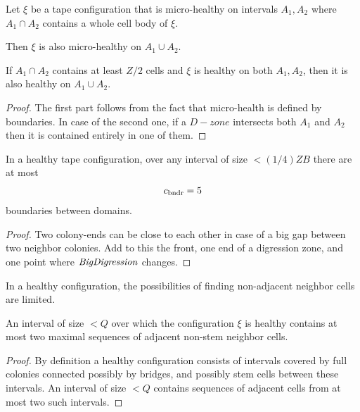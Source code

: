 \documentclass[11pt]{memoir}
\theoremstyle{definition} %
\newtheorem{Premark}{\color{cyan}Peter remark}
\newenvironment{premark}{\begin{Premark}\color{cyan}}{\varqed\end{Premark}}
\newcommand{\fld}[1]{\ensuremath{\textit{#1\/}}}
\def\B{B}
\newcommand{\Q}{Q} %
\newcommand{\Z}{Z} %
\newcommand{\BigDigression}{\fld{BigDigression}}
\newcommand{\cns}[1]{c_{\textrm{\upshape #1}}}
\newcommand{\CBoundaries}{\cns{bndr}}
\begin{document}
\begin{corollary}\label{crl:health-extension}
  Let \( \xi \) be a tape configuration that is micro-healthy on intervals \( A_{1}, A_{2} \) 
where \( A_{1}\cap A_{2} \) contains a whole cell body of \( \xi \).
  \begin{alphenum}
  \item Then \( \xi \) is also micro-healthy on \( A_{1}\cup A_{2} \).
  \item If \( A_{1}\cap A_{2} \) contains at least \( \Z/2 \) cells and \( \xi \) is healthy
    on both \( A_{1}, A_{2} \), then it is also healthy on \( A_{1}\cup A_{2} \).
  \end{alphenum}
\end{corollary}
\begin{proof}
The first part follows from the fact that micro-health is defined by boundaries.
In case of the second one, if a \( D-zone \)
intersects both \( A_{1} \) and \( A_{2} \) then it is contained entirely in one of them.
\end{proof}


\begin{lemma}\label{lem:3-boundaries}
  In a healthy tape configuration, over any interval of size \( <(1/4)\Z\B \) there are at most
  \begin{align}\label{e.eq:boundaries}
   \CBoundaries = 5
 \end{align}
  boundaries between domains.
\end{lemma}
\begin{proof}
  Two colony-ends can be close to each other in case of a big gap between
  two neighbor colonies.
  Add to this the front,
  one end of a digression zone,
  and one point where \( \BigDigression \) changes.
\end{proof}

In a healthy configuration, the possibilities of finding non-adjacent neighbor
cells are limited.

\begin{lemma}\label{lem:two-domains}
  An interval of size \( <\Q \) over which the configuration \( \xi \) is healthy
contains at most two maximal sequences of adjacent non-stem neighbor cells.
\end{lemma}
\begin{proof}
  By definition a healthy configuration consists of intervals covered by
  full colonies connected possibly by bridges, and possibly stem cells between these intervals.
An interval of size \( <\Q \) contains sequences of adjacent cells 
from at most two such intervals.
\end{proof}
\end{document}

